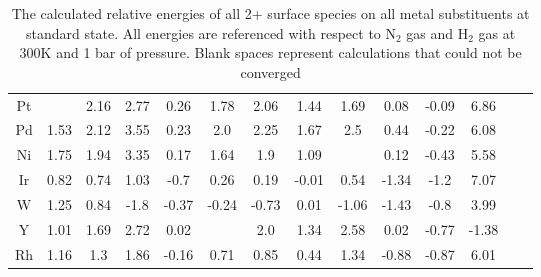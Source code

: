 \begin{table}
\begin{center}
\begin{tabular}{| c | c | c | c | c | c | c | c | c | c | c | c | c | c |}
Pt &  & 2.16 & 2.77 & 0.26 & 1.78 & 2.06 & 1.44 & 1.69 & 0.08 & -0.09 & 6.86 \\
Pd & 1.53 & 2.12 & 3.55 & 0.23 & 2.0 & 2.25 & 1.67 & 2.5 & 0.44 & -0.22 & 6.08 \\
Ni & 1.75 & 1.94 & 3.35 & 0.17 & 1.64 & 1.9 & 1.09 &  & 0.12 & -0.43 & 5.58 \\
Ir & 0.82 & 0.74 & 1.03 & -0.7 & 0.26 & 0.19 & -0.01 & 0.54 & -1.34 & -1.2 & 7.07 \\
W & 1.25 & 0.84 & -1.8 & -0.37 & -0.24 & -0.73 & 0.01 & -1.06 & -1.43 & -0.8 & 3.99 \\
Y & 1.01 & 1.69 & 2.72 & 0.02 &  & 2.0 & 1.34 & 2.58 & 0.02 & -0.77 & -1.38 \\
Rh & 1.16 & 1.3 & 1.86 & -0.16 & 0.71 & 0.85 & 0.44 & 1.34 & -0.88 & -0.87 & 6.01 \\
\hline
\end{tabular}
\end{center}
\caption{The calculated relative energies of all 2+ surface species on all metal substituents at standard state. All energies are referenced with respect to N$_2$ gas and H$_2$ gas at 300K and 1 bar of pressure. Blank spaces represent calculations that could not be converged}
\label{table:energies}
\end{table}

